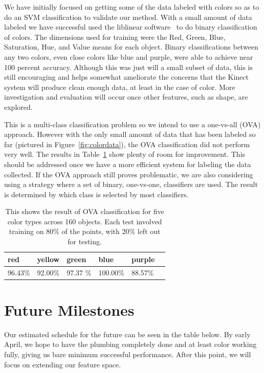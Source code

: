 \documentclass[11pt]{article}
\newcommand\T{\rule{0pt}{3ex}}
\newcommand\B{\rule[-1.2ex]{0pt}{0pt}}
\begin{document}
We have initially focused on getting some of the data labeled with colors so as
to do an SVM classification to validate our method.  With a small amount of
data labeled we have successful used the liblinear software~\cite{LIBLINEAR} to do
binary classification of colors.  The dimensions used for training were the
Red, Green, Blue, Saturation, Hue, and Value means for each object.  Binary
classifications between any two colors, even close colors like blue and purple,
were able to achieve near 100 percent accuracy.  Although this was just will a
small subset of data, this is still encouraging and helps somewhat ameliorate
the concerns that the Kinect system will produce clean enough data, at least in
the case of color.  More investigation and evaluation will occur once other
features, such as shape, are explored.

This is a multi-class classification problem so we intend to use a one-vs-all
(OVA) approach.  However with the only small amount of data that has been
labeled so far (pictured in Figure~\ref{fig:colordata}), the OVA
classification did not perform very well. The results in Table~\ref{tbl:testresults} show plenty of room for improvement. This should
be addressed once we have a more efficient system for labeling the data
collected.  If the OVA approach still proves problematic, we are also
considering using a strategy where a set of binary, one-vs-one, classifiers are
used.  The result is determined by which class is selected by most classifiers.

\begin{table}
\centering
\begin{tabular}{ | l | l | l | l | l | l |}
    \hline
    red &  yellow & green & blue & purple \T \B \\ \hline
    96.43\%  & 92.00\% & 97.37 \% & 100.00\% & 88.57\% \B \T \\ \hline
\end{tabular}
\caption{This shows the result of OVA classification for five color types
    across 160 objects. Each test involved training on 80\% of the points,
           with 20\% left out for testing.}
\label{tbl:testresults}
\end{table}

\section{Future Milestones}
Our estimated schedule for the future can be seen in the table below. By early
April, we hope to have the plumbing completely done and at least color working
fully, giving us bare minimum successful performance. After this point, we
will focus on extending our feature space.
\end{document}
